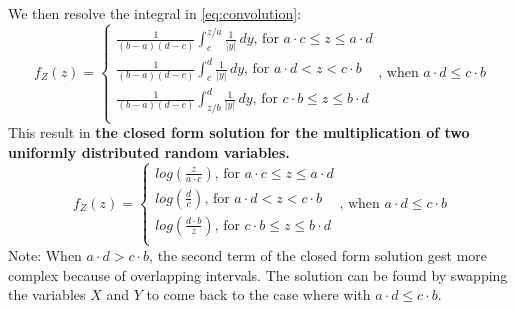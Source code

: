 We then resolve the integral in \ref{eq:convolution}:
\begin{equation}
f_Z(z) = 
\begin{cases}    
  \frac{1}{(b-a)(d-c)}\int_{c}^{z/a} \frac{1}{|y|}\,dy \text{, for $a\cdot c\le z\le a\cdot d$}\\
  \frac{1}{(b-a)(d-c)}\int_{c}^{d} \frac{1}{|y|}\,dy \text{, for $a\cdot d< z< c\cdot b$}\\
  \frac{1}{(b-a)(d-c)}\int_{z/b}^{d} \frac{1}{|y|}\,dy \text{, for $c\cdot b\le z\le b\cdot d$}\\
\end{cases}
\text{, when $a\cdot d \le c\cdot b$}
\end{equation}
This result in \textbf{the closed form solution for the multiplication of two uniformly distributed random variables.}
\begin{equation}
f_Z(z) = 
\begin{cases}    
  log(\frac{z}{a\cdot c}) \text{, for $a\cdot c\le z\le a\cdot d$}\\
  log(\frac{d}{c}) \text{, for $a\cdot d< z< c\cdot b$}\\
  log(\frac{d\cdot b}{z}) \text{, for $c\cdot b\le z\le b\cdot d$}\\
\end{cases}
\text{, when $a\cdot d \le c\cdot b$}
\end{equation}
Note: When $a\cdot d > c\cdot b$, the second term of the closed form solution gest more complex because of overlapping intervals. The solution can be found by swapping the variables $X$ and $Y$ to come back to the case where with $a\cdot d \le c\cdot b$.

